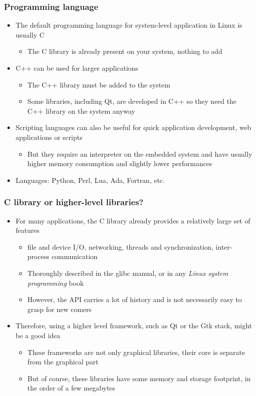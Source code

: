 \begin{frame}
  \frametitle{Programming language}
  \begin{itemize}
  \item The default programming language for system-level application
    in Linux is usually C
    \begin{itemize}
    \item The C library is already present on your system, nothing to
      add
    \end{itemize}
  \item C++ can be used for larger applications
    \begin{itemize}
    \item The C++ library must be added to the system
    \item Some libraries, including Qt, are developed in C++ so they
      need the C++ library on the system anyway
    \end{itemize}
  \item Scripting languages can also be useful for quick application
    development, web applications or scripts
    \begin{itemize}
    \item But they require an interpreter on the embedded system and
      have usually higher memory consumption and slightly lower
      performances
    \end{itemize}
  \item Languages: Python, Perl, Lua, Ada, Fortran, etc.
  \end{itemize}
\end{frame}

\begin{frame}
  \frametitle{C library or higher-level libraries?}
  \begin{itemize}
  \item For many applications, the C library already provides a
    relatively large set of features
    \begin{itemize}
    \item file and device I/O, networking, threads and
      synchronization, inter-process communication
    \item Thoroughly described in the glibc manual, or in any {\em
        Linux system programming} book
    \item However, the API carries a lot of history and is not
      necessarily easy to grasp for new comers
    \end{itemize}
  \item Therefore, using a higher level framework, such as Qt or the
    Gtk stack, might be a good idea
    \begin{itemize}
    \item These frameworks are not only graphical libraries, their
      core is separate from the graphical part
    \item But of course, these libraries have some memory and storage
      footprint, in the order of a few megabytes
    \end{itemize}
  \end{itemize}
\end{frame}

